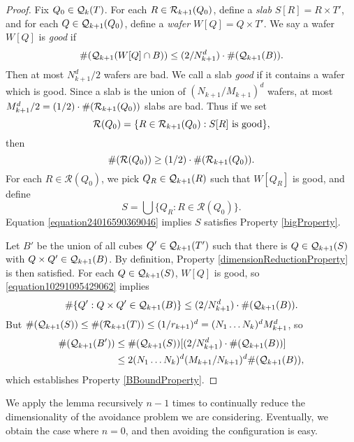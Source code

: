 \begin{proof}
    Fix $Q_0 \in \operatorname{\mathcal{Q}}_k(T)$. For each $R \in \operatorname{\mathcal{R}}_{k+1}(Q_0)$, define a \emph{slab} $S[R] = R \times T'$, and for each $Q \in \operatorname{\mathcal{Q}}_{k+1}(Q_0)$, define a \emph{wafer} $W[Q] = Q \times T'$. We say a wafer $W[Q]$ is \emph{good} if
    \begin{equation} \label{equation10291095429062}
        \#(\operatorname{\mathcal{Q}}_{k+1}(W[Q] \cap B)) \leq (2/N_{k+1}^d) \cdot \#(\operatorname{\mathcal{Q}}_{k+1}(B)).
    \end{equation}
    Then at most $N_{k+1}^d/2$ wafers are bad. We call a slab \emph{good} if it contains a wafer which is good. Since a slab is the union of $(N_{k+1}/M_{k+1})^d$ wafers, at most $M_{k+1}^d /2 = (1/2) \cdot \#(\operatorname{\mathcal{R}}_{k+1}(Q_0))$ slabs are bad. Thus if we set
    \[ \mathcal{R}(Q_0) = \{ R \in \operatorname{\mathcal{R}}_{k+1}(Q_0) : S[R]\ \text{is good} \}, \]
    then
    \begin{equation} \label{equation24016590369046}
        \#(\mathcal{R}(Q_0)) \geq (1/2) \cdot \#(\operatorname{\mathcal{R}}_{k+1}(Q_0)).
    \end{equation}
    For each $R \in \mathcal{R}(Q_0)$, we pick $Q_R \in \operatorname{\mathcal{Q}}_{k+1}(R)$ such that $W[Q_R]$ is good, and define
    \[ S = \bigcup \{ Q_R : R \in \mathcal{R}(Q_0) \}. \]
    Equation \eqref{equation24016590369046} implies $S$ satisfies Property \ref{bigProperty}.

    Let $B'$ be the union of all cubes $Q' \in \operatorname{\mathcal{Q}}_{k+1}(T')$ such that there is $Q \in \operatorname{\mathcal{Q}}_{k+1}(S)$ with $Q \times Q' \in \operatorname{\mathcal{Q}}_{k+1}(B)$. By definition, Property \ref{dimensionReductionProperty} is then satisfied. For each $Q \in \operatorname{\mathcal{Q}}_{k+1}(S)$, $W[Q]$ is good, so \eqref{equation10291095429062} implies
    \[ \# \{ Q' : Q \times Q' \in \operatorname{\mathcal{Q}}_{k+1}(B) \} \leq (2/N_{k+1}^d) \cdot \#(\operatorname{\mathcal{Q}}_{k+1}(B)). \]
    But $\#(\operatorname{\mathcal{Q}}_{k+1}(S)) \leq \#(\operatorname{\mathcal{R}}_{k+1}(T)) \leq (1/r_{k+1})^d = (N_1 \dots N_k)^d M_{k+1}^d$, so
    \begin{align*}
        \#(\operatorname{\mathcal{Q}}_{k+1}(B')) &\leq \#(\operatorname{\mathcal{Q}}_{k+1}(S))[(2/N_{k+1}^d) \cdot \#(\operatorname{\mathcal{Q}}_{k+1}(B))]\\
        &\leq 2(N_1 \dots N_k)^d (M_{k+1}/N_{k+1})^d \#(\operatorname{\mathcal{Q}}_{k+1}(B)),
    \end{align*}
    which establishes Property \ref{BBoundProperty}.
\end{proof}

We apply the lemma recursively $n-1$ times to continually reduce the dimensionality of the avoidance problem we are considering. Eventually, we obtain the case where $n = 0$, and then avoiding the configuration is easy.

